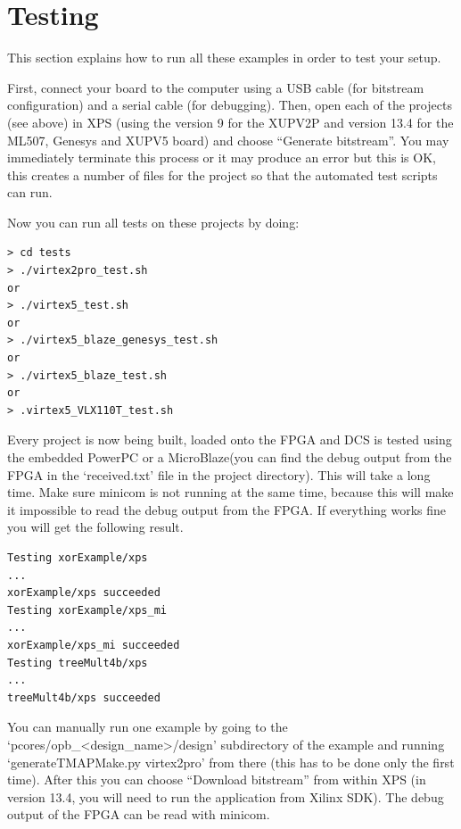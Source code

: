 \documentclass[a4paper,oneside]{memoir}
\begin{document}
\section{Testing}\label{sec:xilinx_testing}
This section explains how to run all these examples in order to test your setup.

First, connect your board to the computer using a USB cable (for bitstream configuration) and a serial cable (for debugging).
Then, open each of the projects (see above) in XPS (using the version 9 for the XUPV2P and version 13.4 for the ML507, Genesys and XUPV5 board) and choose ``Generate bitstream''. You may immediately terminate this process or it may produce an error but this is OK, this creates a number of files for the project so that the automated test scripts can run.


Now you can run all tests on these projects by doing:
\begin{lstlisting}
> cd tests
> ./virtex2pro_test.sh
or
> ./virtex5_test.sh
or
> ./virtex5_blaze_genesys_test.sh
or
> ./virtex5_blaze_test.sh
or
> .virtex5_VLX110T_test.sh
\end{lstlisting}

Every project is now being built, loaded onto the FPGA and DCS is tested using the embedded PowerPC or a MicroBlaze(you can find the debug output from the FPGA in the `received.txt' file in the project directory). This will take a long time. Make sure minicom is not running at the same time, because this will make it impossible to read the debug output from the FPGA. If everything works fine you will get the following result. 

\begin{lstlisting}
Testing xorExample/xps
...
xorExample/xps succeeded
Testing xorExample/xps_mi
...
xorExample/xps_mi succeeded
Testing treeMult4b/xps
...
treeMult4b/xps succeeded
\end{lstlisting}

You can manually run one example by going to the `pcores/opb\_<design\_name>/design' subdirectory of the example and running `generateTMAPMake.py virtex2pro' from there (this has to be done only the first time). After this you can choose ``Download bitstream'' from within XPS (in version 13.4, you will need to run the application from Xilinx SDK).
The debug output of the FPGA can be read with minicom.
\end{document}
